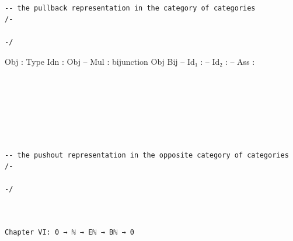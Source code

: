 \documentclass{book}
\newcounter{lcounter}
\newcounter{sectioncount}
\newcounter{subsectioncount}
\renewcommand{\section}[1]{\newpage
\ \\
\ \\
 \begin{center} \scalebox{1.5}{\texttt{\thesectioncount . #1}} \setcounter{sectioncount}{\thesectioncount+1} \setcounter{subsectioncount}{1} \end{center}
 \begin{center}

\ \\
\ \\

\thispagestyle{empty}
\end{center}
}
\begin{document}
\begin{center}
\begin{tcolorbox}[width=5in,colback={white},title={\begin{center}\texttt{Lean \thelcounter} \addtocounter{lcounter}{1}  \end{center}},colbacktitle=Blue,coltitle=black]
\begin{verbatim}

-- the pullback representation in the category of categories
/-

-/

\end{verbatim}%
\end{tcolorbox}
\end{center}



  Obj : Type
  Idn : Obj
--  Mul : bijunction Obj Bij
--  Id₁ : 
--  Id₂ :
--  Ass :




\section{\texttt{pushout}}

\begin{center}
\begin{tcolorbox}[width=5in,colback={white},title={\begin{center}\texttt{Lean \thelcounter} \addtocounter{lcounter}{1}  \end{center}},colbacktitle=Blue,coltitle=black]
\begin{verbatim}

-- the pushout representation in the opposite category of categories
/-

-/

\end{verbatim}%
\end{tcolorbox}
\end{center}



\iffalse
\newpage
{
\Huge 
\begin{center}
\ \\
\ \\
\thispagestyle{empty}
\texttt{Chapter VI: 0 → ℕ → Eℕ → Bℕ → 0}
\end{center}
}




\ \\
\ \\
\ \\
\ \\
\end{document}
